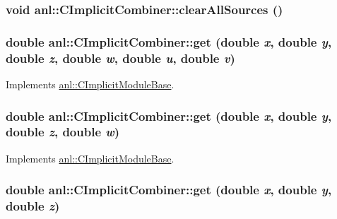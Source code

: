 \label{classanl_1_1CImplicitCombiner_aba0c7d2cc2df41bbf7a9b173309380f6}
\hypertarget{classanl_1_1CImplicitCombiner_a165b52c3beea8e67d2570bad2a8b67ac}{
\subsubsection[{clearAllSources}]{\setlength{\rightskip}{0pt plus 5cm}void anl::CImplicitCombiner::clearAllSources ()}}
\label{classanl_1_1CImplicitCombiner_a165b52c3beea8e67d2570bad2a8b67ac}
\hypertarget{classanl_1_1CImplicitCombiner_ad4b8babff3aebe409e931a4453c0f617}{
\subsubsection[{get}]{\setlength{\rightskip}{0pt plus 5cm}double anl::CImplicitCombiner::get (double {\em x}, \/  double {\em y}, \/  double {\em z}, \/  double {\em w}, \/  double {\em u}, \/  double {\em v})}}
\label{classanl_1_1CImplicitCombiner_ad4b8babff3aebe409e931a4453c0f617}


Implements \hyperlink{classanl_1_1CImplicitModuleBase_aa40b7d54572197612a4fea44b63447eb}{anl::CImplicitModuleBase}.\hypertarget{classanl_1_1CImplicitCombiner_aaaeeee91ac651cd74432806f8533d9e6}{
\subsubsection[{get}]{\setlength{\rightskip}{0pt plus 5cm}double anl::CImplicitCombiner::get (double {\em x}, \/  double {\em y}, \/  double {\em z}, \/  double {\em w})}}
\label{classanl_1_1CImplicitCombiner_aaaeeee91ac651cd74432806f8533d9e6}


Implements \hyperlink{classanl_1_1CImplicitModuleBase_a3cf520bdab59631864253c03b4e1723f}{anl::CImplicitModuleBase}.\hypertarget{classanl_1_1CImplicitCombiner_a44bf6015e5f1895cc494ed7188401172}{
\subsubsection[{get}]{\setlength{\rightskip}{0pt plus 5cm}double anl::CImplicitCombiner::get (double {\em x}, \/  double {\em y}, \/  double {\em z})}}
\label{classanl_1_1CImplicitCombiner_a44bf6015e5f1895cc494ed7188401172}


